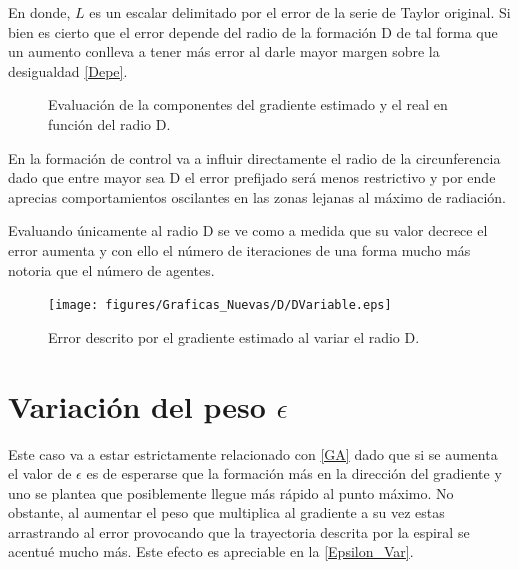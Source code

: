 En donde, $L$ es un escalar delimitado por el error de la serie de Taylor original. Si bien es cierto que el error depende del radio de la formación D de tal forma que un aumento conlleva a tener más error al darle mayor margen sobre la desigualdad \ref{Depe}.

\begin{figure}[H]
  \begin{center}
    \caption{Evaluación de la componentes del gradiente estimado y el real en función del radio D.}
    \label{Gradiente_Var_D}
  \end{center}
\end{figure}

En la formación de control va a influir directamente el radio de la circunferencia dado que entre mayor sea D el error prefijado será menos restrictivo y por ende aprecias comportamientos oscilantes en las zonas lejanas al máximo de radiación.

Evaluando únicamente al radio D se ve como a medida que su valor decrece el error aumenta y con ello el número de iteraciones de una forma mucho más notoria que el número de agentes. 

\begin{figure}[H]
\centering
\texttt{[image: figures/Graficas\_Nuevas/D/DVariable.eps]}
\caption{Error descrito por el gradiente estimado al variar el radio D.} \label{D_Var_Error}
\end{figure}

\section{Variación del peso $\epsilon$}

Este caso va a estar estrictamente relacionado con \ref{GA} dado que si se aumenta el valor de $\epsilon$ es de esperarse que la formación más en la dirección del gradiente y uno se plantea que posiblemente llegue más rápido al punto máximo. No obstante, al aumentar el peso que multiplica al gradiente a su vez estas arrastrando al error provocando que la trayectoria descrita por la espiral se acentué mucho más. Este efecto es apreciable en la \ref{Epsilon_Var}.

